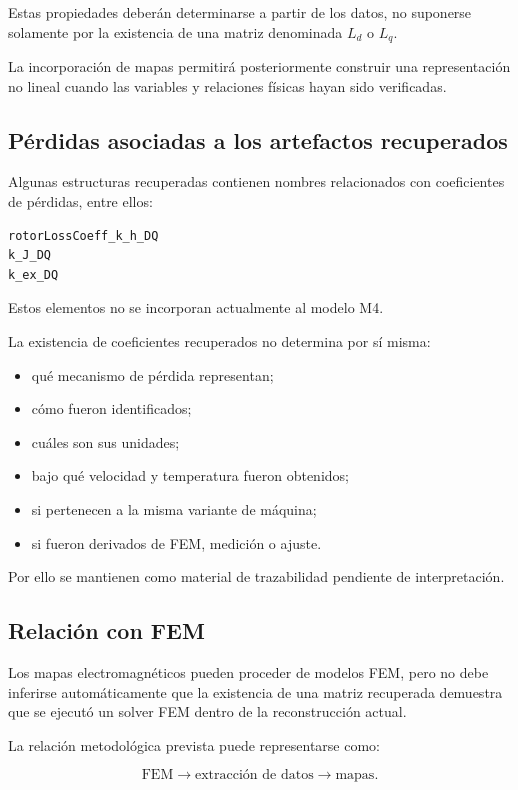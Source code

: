 Estas propiedades deberán determinarse a partir de los datos, no suponerse solamente por la existencia de una matriz denominada $L_d$ o $L_q$.

La incorporación de mapas permitirá posteriormente construir una representación no lineal cuando las variables y relaciones físicas hayan sido verificadas.

\subsection{Pérdidas asociadas a los artefactos recuperados}

Algunas estructuras recuperadas contienen nombres relacionados con coeficientes de pérdidas, entre ellos:

\begin{verbatim}
rotorLossCoeff_k_h_DQ
k_J_DQ
k_ex_DQ
\end{verbatim}

Estos elementos no se incorporan actualmente al modelo M4.

La existencia de coeficientes recuperados no determina por sí misma:

\begin{itemize}
\item qué mecanismo de pérdida representan;
\item cómo fueron identificados;
\item cuáles son sus unidades;
\item bajo qué velocidad y temperatura fueron obtenidos;
\item si pertenecen a la misma variante de máquina;
\item si fueron derivados de FEM, medición o ajuste.
\end{itemize}

Por ello se mantienen como material de trazabilidad pendiente de interpretación.

\subsection{Relación con FEM}

Los mapas electromagnéticos pueden proceder de modelos FEM, pero no debe inferirse automáticamente que la existencia de una matriz recuperada demuestra que se ejecutó un solver FEM dentro de la reconstrucción actual.

La relación metodológica prevista puede representarse como:

\begin{equation}
\mathrm{FEM}
\rightarrow
\text{extracción de datos}
\rightarrow
\text{mapas}.
\end{equation}

